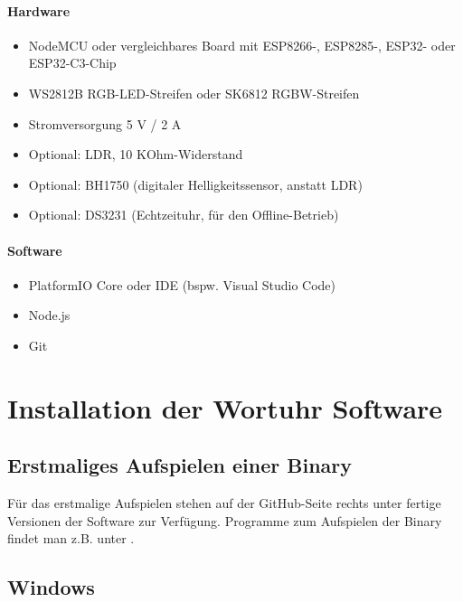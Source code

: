 \documentclass[12pt,a4paper, german,oneside, headinclude, headsepline,plainheadsepline,BCOR20mm, DIV18,parskip=half, openright, numbers=noenddot, captions=tableheading,version=first,listof=totoc,version=first]{scrbook}
\begin{document}
\subsubsection{Hardware}

\begin{itemize}
    \item NodeMCU oder vergleichbares Board mit ESP8266-, ESP8285-, ESP32- oder ESP32-C3-Chip
    \item WS2812B RGB-LED-Streifen oder SK6812 RGBW-Streifen
    \item Stromversorgung 5 V / 2 A
    \item Optional: LDR, 10 KOhm-Widerstand
    \item Optional: BH1750 (digitaler Helligkeitssensor, anstatt LDR)
    \item Optional: DS3231 (Echtzeituhr, für den Offline-Betrieb)
\end{itemize}

\subsubsection{Software}

\begin{itemize}
    \item PlatformIO Core oder IDE (bspw. Visual Studio Code)
    \item Node.js
    \item Git
\end{itemize}

\chapter{Installation der Wortuhr Software}

\section{Erstmaliges Aufspielen einer Binary}
Für das erstmalige Aufspielen stehen auf der GitHub-Seite rechts unter  fertige Versionen der Software zur Verfügung. Programme zum Aufspielen der Binary findet man z.B. unter .

\section{Windows}
\end{document}
